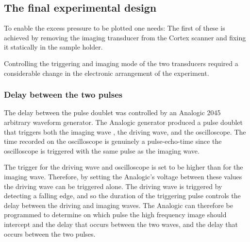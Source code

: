 

\subsection{The final experimental design} \label{sec:exp:finalDesign}

To enable the excess pressure to be plotted one needs:
The first of these is achieved by removing the imaging transducer from the Cortex scanner
and fixing it statically in the sample holder. %

Controlling the triggering and imaging mode of the two transducers 
required a considerable change in the electronic arrangement of the experiment.



\subsubsection{Delay between the two pulses}
The delay between the pulse doublet was controlled by
an Analogic 2045 arbitrary waveform generator.
The Analogic generator produced a pulse doublet that  triggers both the imaging wave
, the driving wave, and the oscilloscope.
The time recorded on the oscilloscope is genuinely a pulse-echo-time since the oscilloscope is triggered with the same pulse as the imaging wave.

The trigger for the driving wave and oscilloscope is set to be higher than for the imaging wave.
Therefore, by setting the Analogic's voltage between these values
the driving wave can be triggered alone.
The driving wave is triggered by detecting a falling edge,
and so the duration of the triggering pulse controls the delay between the driving and imaging waves.
The Analogic can therefore be programmed to determine on which pulse the high frequency image should intercept
and the delay that occurs between the two waves, and the delay that occurs between the two pulses.


